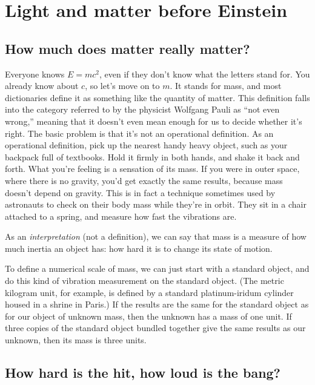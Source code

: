 \chapter{Light and matter before Einstein}

\section{How much does matter really matter?}

Everyone knows $E=mc^2$, even if they don't know what the letters stand for.
You already know about $c$, so let's move on to $m$. It stands for mass,
and most dictionaries define it as something like the quantity of
matter. This definition falls into the category referred to by the physicist Wolfgang Pauli
as ``not even wrong,'' meaning that it doesn't even mean enough for us to decide whether
it's right. The basic problem is that it's not an operational definition.
As an operational definition, pick up the nearest handy heavy object, such as your backpack
full of textbooks. Hold it firmly in both hands, and shake it back and forth. What you're
feeling is a sensation of its mass. If you were in outer space, where there is no gravity,
you'd get exactly the same results, because mass doesn't depend on gravity. This is in fact
a technique sometimes used by astronauts to check on their body mass while they're in orbit.
They sit in a chair attached to a spring, and measure how fast the vibrations are.


As an \emph{interpretation} (not a definition), we can say that mass is a measure of how
much inertia an object has: how hard it is to change its state of motion.

To define a numerical scale of mass, we can just start with a standard object, and do
this kind of vibration measurement on the standard object. (The metric kilogram unit, for
example, is defined by a standard platinum-iridum cylinder housed in a shrine in Paris.)
If the results are the same for the standard object as for our object of unknown mass,
then the unknown has a mass of one unit. If three copies of the standard object bundled
together give the same results as our unknown, then its mass is three units.

\section[How hard, how loud?]{How hard is the hit, how loud is the bang?}

